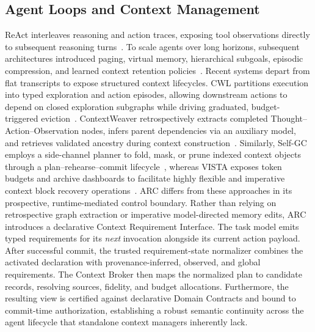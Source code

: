 \subsection{Agent Loops and Context Management}
ReAct interleaves reasoning and action traces, exposing tool observations directly to subsequent reasoning turns~\cite{react}.
To scale agents over long horizons, subsequent architectures introduced paging, virtual memory, hierarchical subgoals,
episodic compression, and learned context retention policies~\cite{memgpt,readagent,hiagent,amem,acon,agentfold,mem1}.
Recent systems depart from flat transcripts to expose structured context lifecycles.
CWL partitions execution into typed exploration and action episodes, allowing downstream actions to depend on closed exploration subgraphs
while driving graduated, budget-triggered eviction~\cite{cwl}.
ContextWeaver retrospectively extracts completed Thought--Action--Observation nodes, infers parent dependencies via an auxiliary model,
and retrieves validated ancestry during context construction~\cite{contextweaver}.
Similarly, Self-GC employs a side-channel planner to fold, mask, or prune indexed context objects through
a plan--rehearse--commit lifecycle~\cite{selfgc}, whereas VISTA exposes token budgets and archive dashboards to
facilitate highly flexible and imperative context block recovery operations~\cite{vista}.
ARC differs from these approaches in its prospective, runtime-mediated control boundary.
Rather than relying on retrospective graph extraction or imperative model-directed memory edits, ARC introduces
a declarative Context Requirement Interface.
The task model emits typed requirements for its \emph{next} invocation alongside its current action payload.
After successful commit, the trusted requirement-state normalizer combines the activated declaration with provenance-inferred, observed, and global requirements. The Context Broker then maps the normalized plan to candidate records,
resolving sources, fidelity, and budget allocations.
Furthermore, the resulting view is certified against declarative Domain Contracts and bound to commit-time authorization,
establishing a robust semantic continuity across the agent lifecycle that standalone context managers inherently lack.
